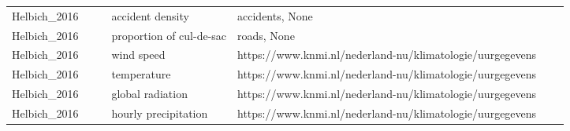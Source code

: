 \documentclass{article}
\begin{document}
\begin{table}
\begin{tabular}{lllllll}
Helbich\_2016    &                                                                                                     &         & accident density                                                                              & accidents, None                                                                                                                                                                                  &                                       &          \\
Helbich\_2016    &                                                                                                     &         & proportion of cul-de-sac                                                                      & roads, None                                                                                                                                                                                      &                                       &          \\
Helbich\_2016    &                                                                                                     &         & wind speed                                                                                    & https://www.knmi.nl/nederland-nu/klimatologie/uurgegevens                                                                                                                                        &                                       &          \\
Helbich\_2016    &                                                                                                     &         & temperature                                                                                   & https://www.knmi.nl/nederland-nu/klimatologie/uurgegevens                                                                                                                                        &                                       &          \\
Helbich\_2016    &                                                                                                     &         & global radiation                                                                              & https://www.knmi.nl/nederland-nu/klimatologie/uurgegevens                                                                                                                                        &                                       &          \\
Helbich\_2016    &                                                                                                     &         & hourly precipitation                                                                          & https://www.knmi.nl/nederland-nu/klimatologie/uurgegevens                                                                                                                                        &                                       &          \\

\end{tabular}
\end{table}
\end{document}
